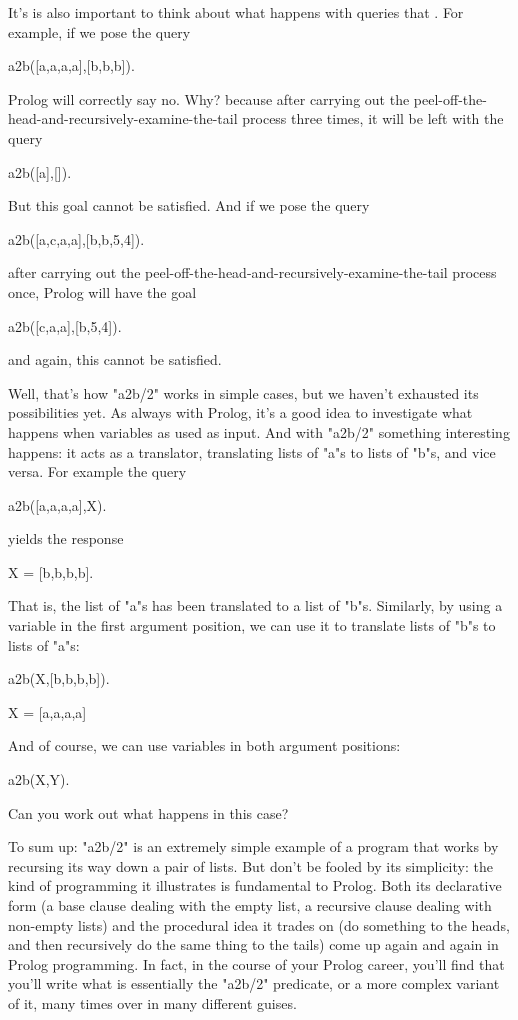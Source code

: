 It's is also important to think about what  happens with queries
that . For example, if we pose the query
\begin{LPNcodedisplay}
a2b([a,a,a,a],[b,b,b]).
\end{LPNcodedisplay}
Prolog will correctly say no. Why? because after carrying out the
peel-off-the-head-and-recursively-examine-the-tail process three
times, it will be left with the query
\begin{LPNcodedisplay}
a2b([a],[]).
\end{LPNcodedisplay}
But this goal cannot be satisfied.
And if we pose the query
\begin{LPNcodedisplay}
a2b([a,c,a,a],[b,b,5,4]).
\end{LPNcodedisplay}
after carrying out the
peel-off-the-head-and-recursively-examine-the-tail process once,
Prolog will have the goal
\begin{LPNcodedisplay}
a2b([c,a,a],[b,5,4]).
\end{LPNcodedisplay}
and again, this cannot be satisfied.

Well, that's how "a2b/2" works in simple cases, but we
haven't exhausted its possibilities yet. As always with Prolog, it's a
good idea to investigate what happens when variables as used as
input. And with "a2b/2" something interesting happens: it
acts as a translator, translating lists of "a"s to lists of
"b"s, and vice versa.  For example the query
\begin{LPNcodedisplay}
a2b([a,a,a,a],X).
\end{LPNcodedisplay}
yields the response
\begin{LPNcodedisplay}
X = [b,b,b,b].
\end{LPNcodedisplay}
That is, the list of "a"s has been translated to a list of
"b"s. Similarly, by using a variable in the first argument
position, we can use it to translate lists of "b"s
to lists of "a"s:
\begin{LPNcodedisplay}
a2b(X,[b,b,b,b]).

X = [a,a,a,a]
\end{LPNcodedisplay}

And of course, we can use variables in both argument positions:
\begin{LPNcodedisplay}
a2b(X,Y).
\end{LPNcodedisplay}
Can you work out what happens in this case?

To sum up: "a2b/2" is an extremely simple example of a
program that works by recursing its way down a pair of lists. But
don't be fooled by its simplicity: the kind of programming it
illustrates is fundamental to Prolog.  Both its declarative form (a
base clause dealing with the empty list, a recursive clause dealing
with non-empty lists) and the procedural idea it trades on (do
something to the heads, and then recursively do the same thing to the
tails) come up again and again in Prolog programming. In fact, in the
course of your Prolog career, you'll find that you'll write what is
essentially the "a2b/2" predicate, or a more complex
variant of it, many times over in many different guises.

